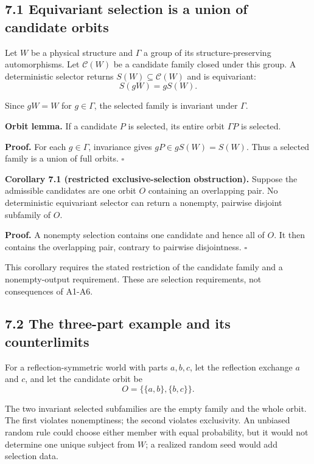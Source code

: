 \documentclass[
  11pt,
  a4paper,
]{article}
\begin{document}
\hypertarget{equivariant-selection-is-a-union-of-candidate-orbits}{%
\subsection{7.1 Equivariant selection is a union of candidate
orbits}\label{equivariant-selection-is-a-union-of-candidate-orbits}}

Let \(W\) be a physical structure and \(\Gamma\) a group of its
structure-preserving automorphisms. Let \(\mathcal C(W)\) be a candidate
family closed under this group. A deterministic selector returns
\(S(W)\subseteq\mathcal C(W)\) and is equivariant:
\nopagebreak[4]
\[
S(gW)=gS(W).
\]

Since \(gW=W\) for \(g\in\Gamma\), the selected family is invariant
under \(\Gamma\).

\textbf{Orbit lemma.} If a candidate \(P\) is selected, its entire orbit
\(\Gamma P\) is selected.

\textbf{Proof.} For each \(g\in\Gamma\), invariance gives
\(gP\in gS(W)=S(W)\). Thus a selected family is a union of full orbits.
\(\square\)

\textbf{Corollary 7.1 (restricted exclusive-selection obstruction).}
Suppose the admissible candidates are one orbit \(O\) containing an
overlapping pair. No deterministic equivariant selector can return a
nonempty, pairwise disjoint subfamily of \(O\).

\textbf{Proof.} A nonempty selection contains one candidate and hence
all of \(O\). It then contains the overlapping pair, contrary to
pairwise disjointness. \(\square\)

This corollary requires the stated restriction of the candidate family
and a nonempty-output requirement. These are selection requirements, not
consequences of A1-A6.

\hypertarget{the-three-part-example-and-its-counterlimits}{%
\subsection{7.2 The three-part example and its
counterlimits}\label{the-three-part-example-and-its-counterlimits}}

For a reflection-symmetric world with parts \(a,b,c\), let the
reflection exchange \(a\) and \(c\), and let the candidate orbit be
\nopagebreak[4]
\[
O=\bigl\{\{a,b\},\{b,c\}\bigr\}.
\]

The two invariant selected subfamilies are the empty family and the
whole orbit. The first violates nonemptiness; the second violates
exclusivity. An unbiased random rule could choose either member with
equal probability, but it would not determine one unique subject from
\(W\); a realized random seed would add selection data.
\end{document}
